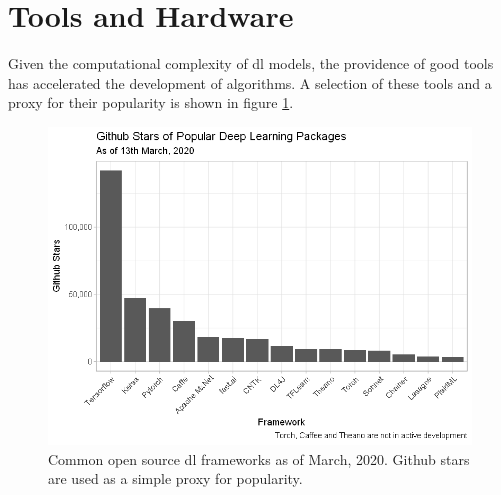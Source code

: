 \section{Tools and Hardware}

Given the computational complexity of  \gls{dl} models, the providence of good tools has accelerated the development of algorithms. A selection of these tools and a proxy for their popularity is shown in figure \ref{fig:git_stars}.
\bigskip

\begin{figure}
    \centering
    \includegraphics[width=120mm]{figs/gitstars.png}
    \caption[Popular \gls{dl} frameworks]{Common open source \gls{dl} frameworks as of March, 2020. Github stars are used as a simple proxy for popularity.}
    \label{fig:git_stars}
\end{figure}

